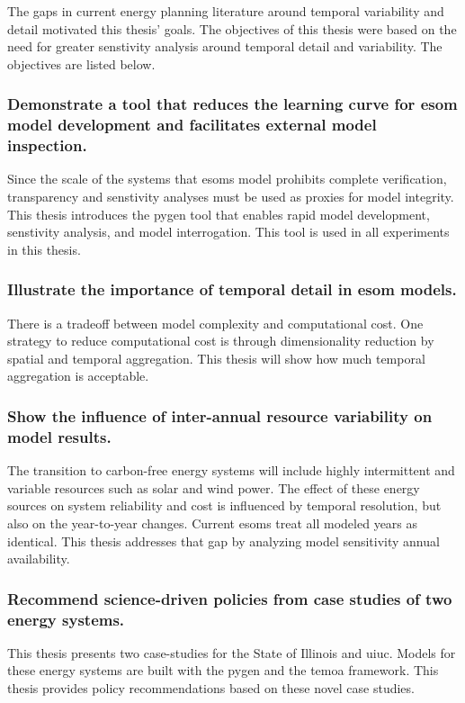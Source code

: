 The gaps in current energy planning literature around temporal variability and
detail motivated this thesis' goals.
The objectives of this thesis were based on the need for greater senstivity
analysis around temporal detail and variability. The objectives are listed below.

\subsubsection{Demonstrate a tool that reduces the learning curve for \gls{esom}
model development and facilitates external model inspection.} Since the scale
of the systems that \glspl{esom} model prohibits complete verification, transparency
and senstivity analyses must be used as proxies for model integrity. This thesis
introduces the \gls{pygen} tool that enables rapid model development, senstivity
analysis, and model interrogation. This tool is used in all experiments in this
thesis.

\subsubsection{Illustrate the importance of temporal detail in \gls{esom} models.}
There is a tradeoff between model complexity and computational cost. One strategy
to reduce computational cost is through dimensionality reduction by spatial
and temporal aggregation. This thesis will show how much temporal aggregation is
acceptable.

\subsubsection{Show the influence of inter-annual resource variability on model
results.} The transition to carbon-free energy systems will include highly intermittent
and variable resources such as solar and wind power. The effect of these energy
sources on system reliability and cost is influenced by temporal resolution, but
also on the year-to-year changes. Current \glspl{esom} treat all modeled years
as identical. This thesis addresses that gap by analyzing model sensitivity annual
availability.

\subsubsection{Recommend science-driven policies from case studies of two energy systems.}
This thesis presents two case-studies for the State of Illinois and \gls{uiuc}.
Models for these energy systems are built with the \gls{pygen} and the \gls{temoa}
framework. This thesis provides policy recommendations based on these novel case
studies.
